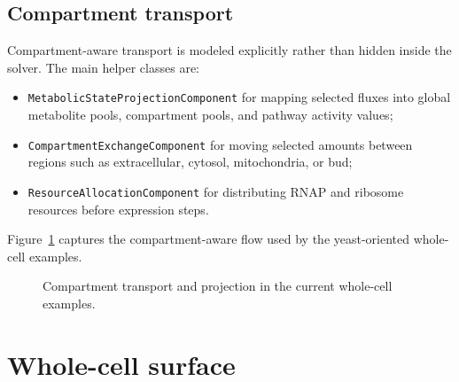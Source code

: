 \subsection{Compartment transport}

Compartment-aware transport is modeled explicitly rather than hidden inside the
solver. The main helper classes are:
\begin{itemize}
\item \texttt{MetabolicStateProjectionComponent} for mapping selected fluxes into
      global metabolite pools, compartment pools, and pathway activity values;
\item \texttt{CompartmentExchangeComponent} for moving selected amounts between
      regions such as extracellular, cytosol, mitochondria, or bud;
\item \texttt{ResourceAllocationComponent} for distributing RNAP and ribosome
      resources before expression steps.
\end{itemize}

Figure~\ref{fig:compartment-transport-flow} captures the compartment-aware flow
used by the yeast-oriented whole-cell examples.

\begin{figure}[htbp]
\centering
\caption{Compartment transport and projection in the current whole-cell examples.}
\label{fig:compartment-transport-flow}
\end{figure}

\section{Whole-cell surface}

